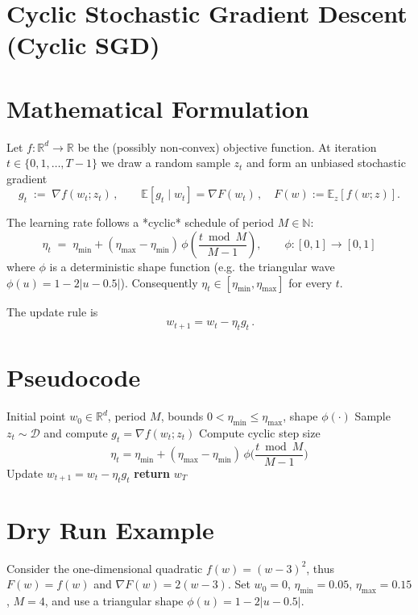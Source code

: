 \documentclass{article}
\newcommand{\E}{\mathbb{E}}
\newcommand{\R}{\mathbb{R}}
\begin{document}
\section*{Cyclic Stochastic Gradient Descent (Cyclic SGD)}

\section*{Mathematical Formulation}
Let $f:\R^{d}\rightarrow\R$ be the (possibly non‑convex) objective function.  
At iteration $t\in\{0,1,\dots,T-1\}$ we draw a random sample $z_{t}$ and form an unbiased stochastic gradient
\[
g_{t}\;:=\;\nabla f(w_{t};z_{t})\,,\qquad 
\E\!\left[g_{t}\mid w_{t}\right]=\nabla F(w_{t})\,,\quad 
F(w):=\E_{z}[f(w;z)] .
\]

The learning rate follows a *cyclic* schedule of period $M\in\mathbb{N}$:
\[
\eta_{t}\;=\;\eta_{\min}+(\eta_{\max}-\eta_{\min})\,
\phi\!\left(\frac{t\bmod M}{M-1}\right),\qquad 
\phi:[0,1]\rightarrow[0,1]
\]
where $\phi$ is a deterministic shape function (e.g. the triangular wave
$\phi(u)=1-2|u-0.5|$).  Consequently $\eta_{t}\in[\eta_{\min},\eta_{\max}]$ for every $t$.

The update rule is
\[
\boxed{\,w_{t+1}=w_{t}-\eta_{t}g_{t}\,}.
\]

\section*{Pseudocode}
\begin{algorithm}[H]
\caption{Cyclic SGD}
\begin{algorithmic}[1]
\Require Initial point $w_{0}\in\R^{d}$, period $M$, bounds $0<\eta_{\min}\le\eta_{\max}$, shape $\phi(\cdot)$
    \State Sample $z_{t}\sim\mathcal{D}$ and compute $g_{t}=\nabla f(w_{t};z_{t})$
    \State Compute cyclic step size
    \[
    \eta_{t}= \eta_{\min}+(\eta_{\max}-\eta_{\min})\,
    \phi\!\Big(\frac{t\bmod M}{M-1}\Big)
    \]
    \State Update $w_{t+1}=w_{t}-\eta_{t}g_{t}$
\EndFor
\State \textbf{return} $w_{T}$
\end{algorithmic}
\end{algorithm}

\section*{Dry Run Example}
Consider the one‑dimensional quadratic $f(w)=(w-3)^{2}$, thus $F(w)=f(w)$ and $\nabla F(w)=2(w-3)$.  
Set $w_{0}=0$, $\eta_{\min}=0.05$, $\eta_{\max}=0.15$, $M=4$, and use a triangular shape $\phi(u)=1-2|u-0.5|$.
\end{document}
